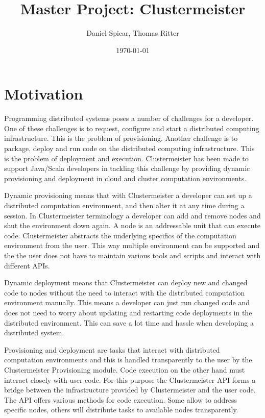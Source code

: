 \documentclass{article}
\begin{document}
\title{Master Project: Clustermeister}


\author{Daniel Spicar, Thomas Ritter}

\date{\today}

\maketitle


\section{Motivation}

Programming distributed systems poses a number of challenges for a developer. One of these challenges is to request, configure and start a distributed computing infrastructure. This is the problem of provisioning. Another challenge is to package, deploy and run code on the distributed computing infrastructure. This is the problem of deployment and execution. Clustermeister has been made to support Java/Scala developers in tackling this challenge by providing dynamic provisioning and deployment in cloud and cluster computation environments.

Dynamic provisioning means that with Clustermeister a developer can set up a distributed computation environment, and then alter it at any time during a session. In Clustermeister terminology a developer can add and remove nodes and shut the environment down again. A node is an addressable unit that can execute code. Clustermeister abstracts the underlying specifics of the computation environment from the user. This way multiple environment can be supported and the the user does not have to maintain various tools and scripts and interact with different APIs.

Dynamic deployment means that Clustermeister can deploy new and changed code to nodes without the need to interact with the distributed computation environment manually. This means a developer can just run changed code and does not need to worry about updating and restarting code deployments in the distributed environment. This can save a lot time and hassle when developing a distributed system.

Provisioning and deployment are tasks that interact with distributed computation environments and this is handled transparently to the user by the Clustermeister Provisioning module. Code execution on the other hand must interact closely with user code. For this purpose the Clustermeister API forms a bridge between the infrastructure provided by Clustermeister and the user code. The API offers various methods for code execution. Some allow to address specific nodes, others will distribute tasks to available nodes transparently.
\end{document}
